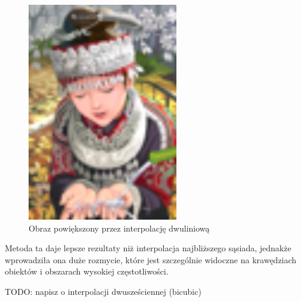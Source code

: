 \begin{figure}[ht]
\begin{minipage}[t]{0.33\linewidth}
        \includegraphics[width=\linewidth]{Rozdziały/02.Podstawy_teoretyczne/Obrazy/comic_BILINEARx4.png}
        \caption{Obraz powiększony przez interpolację dwuliniową}
        \label{fig:image10}
    \end{minipage}
\end{figure}


Metoda ta daje lepsze rezultaty niż interpolacja najbliższego sąsiada, jednakże wprowadziła ona duże rozmycie, które jest szczególnie widoczne na krawędziach obiektów i obszarach wysokiej częstotliwości.



TODO: napisz o interpolacji dwusześciennej (bicubic)















